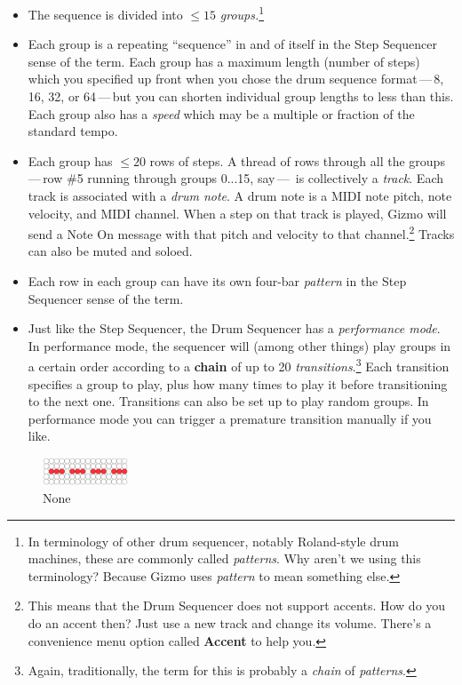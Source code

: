 \documentclass{article}
\begin{document}
\begin{itemize} 
\item The sequence is divided into \(\leq 15\) {\it groups.}\footnote{In terminology of other drum sequencer, notably Roland-style drum machines, these are commonly called {\it patterns}.  Why aren't we using this terminology?  Because Gizmo uses {\it pattern} to mean something else.}
\item Each group is a repeating ``sequence'' in and of itself in the Step Sequencer sense of the term.  Each group has a maximum length (number of steps) which you specified up front when you chose the drum sequence format\,---\,8, 16, 32, or 64\,---\,but you can shorten individual group lengths to less than this.  Each group also has a {\it speed} which may be a multiple or fraction of the standard tempo.
\item Each group has \(\leq 20\) rows of steps.  A thread of rows through all the groups\,---\,row \#5 running through groups 0...15, say\,---\, is collectively a {\it track}.  Each track is associated with a {\it drum note}.  A drum note is a MIDI note pitch, note velocity, and MIDI channel.  When a step on that track is played, Gizmo will send a Note On message with that pitch and velocity to that channel.\footnote{This means that the Drum Sequencer does not support accents.  How do you do an accent then?  Just use a new track and change its volume.  There's a convenience menu option called {\bf Accent} to help you.} Tracks can also be muted and soloed.
\item Each row in each group can have its own four-bar {\it pattern} in the Step Sequencer sense of the term.
\item Just like the Step Sequencer, the Drum Sequencer has a {\it performance mode}.  In performance mode, the sequencer will (among other things) play groups in a certain order according to a {\bf chain} of up to 20 {\it transitions}.\footnote{Again, traditionally, the term for this is probably a {\it chain} of {\it patterns}.}  Each transition specifies a group to play, plus how many times to play it before transitioning to the next one.  Transitions can also be set up to play random groups.  In performance mode you can trigger a premature transition manually if you like.
\end{itemize}

\begin{figure}
\includegraphics[width=1in]{none.pdf}
\vspace{-2em}\caption{\small None}\vspace{-1em}
\end{figure}
\end{document}
